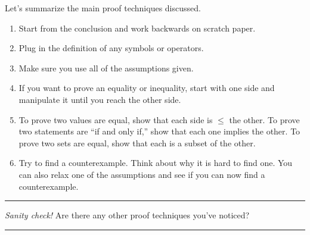 \documentclass[11pt]{article}
\begin{document}
    Let's summarize the main proof techniques discussed.
    
    \begin{enumerate}
        \item
        Start from the conclusion and work backwards on scratch paper.
        
        \item
        Plug in the definition of any symbols or operators.
        
        \item
        Make sure you use all of the assumptions given.
        
        \item
        If you want to prove an equality or inequality, start with one side and manipulate
        it until you reach the other side.
        
        \item
        To prove two values are equal, show that each side is $\leq$ the other. To prove
        two statements are ``if and only if,'' show that each one implies the other. To
        prove two sets are equal, show that each is a subset of the other.
    
        \item
        Try to find a counterexample. Think about why it is hard to find one. You can also
        relax one of the assumptions and see if you can now find a counterexample.
        
    \end{enumerate}

    \rule{\textwidth}{0.4pt}
    
    \vspace{-5pt}
    \textit{Sanity check!} Are there any other proof techniques you've noticed?
    
    \vspace{-10pt}
    \rule{\textwidth}{0.4pt}

\end{document}

